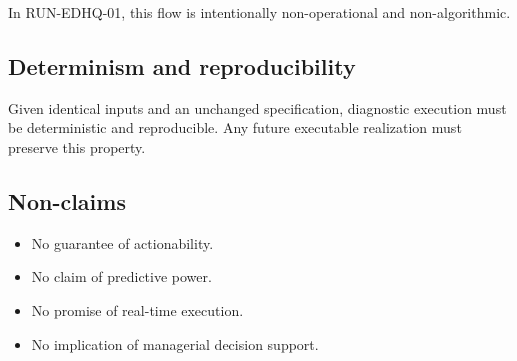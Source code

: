 In RUN-EDHQ-01, this flow is intentionally non-operational and non-algorithmic.

\subsection{Determinism and reproducibility}
Given identical inputs and an unchanged specification, diagnostic execution
must be deterministic and reproducible.
Any future executable realization must preserve this property.

\subsection{Non-claims}
\begin{itemize}
  \item No guarantee of actionability.
  \item No claim of predictive power.
  \item No promise of real-time execution.
  \item No implication of managerial decision support.
\end{itemize}
